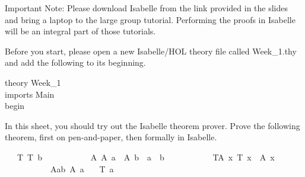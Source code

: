 %
\begin{isabellebody}%
%
%
\isadelimtheory
%
\endisadelimtheory
%
\isatagtheory
%
\endisatagtheory
{\isafoldtheory}%
%
\isadelimtheory
%
\endisadelimtheory
%
\begin{isamarkuptext}%
%
\end{isamarkuptext}\isamarkuptrue%
%
\begin{isamarkuptext}%
Important Note: Please download Isabelle from the link provided in the slides and bring a 
      laptop to the large group tutorial. Performing the proofs in Isabelle will be an integral part
      of those tutorials.%
\end{isamarkuptext}\isamarkuptrue%
%
\begin{isamarkuptext}%
Before you start, please open a new Isabelle/HOL theory file called Week\_1.thy and add the
       following to its beginning.

\noindent theory Week\_1\\
imports Main\\
begin%
\end{isamarkuptext}\isamarkuptrue%
%
\begin{isamarkuptext}%
%
\end{isamarkuptext}\isamarkuptrue%
%
\begin{isamarkuptext}%
In this sheet, you should try out the Isabelle theorem prover.
Prove the following theorem, first on pen-and-paper, then formally in Isabelle.%
\end{isamarkuptext}\isamarkuptrue%
\isamarkupfalse%
\isanewline
\ \ \ T{\isacharcolon}{\kern0pt}\ {\isachardoublequoteopen}T\ b{\isachardoublequoteclose}\isanewline
\ \ \ \ \ \ \ \ \ \ \ A{\isacharcolon}{\kern0pt}\ {\isachardoublequoteopen}A\ a\ {\isasymand}\ A\ b\ {\isasymLongrightarrow}\ a\ {\isacharequal}{\kern0pt}\ b{\isachardoublequoteclose}\isanewline
\ \ \ \ \ \ \ \ \ \ \ TA{\isacharcolon}{\kern0pt}\ {\isachardoublequoteopen}{\isasymAnd}x{\isachardot}{\kern0pt}\ T\ x\ {\isasymLongrightarrow}\ A\ x{\isachardoublequoteclose}\isanewline
\ \ \ \ \ \ \ \ \ \ \ Aab{\isacharcolon}{\kern0pt}\ {\isachardoublequoteopen}A\ a{\isachardoublequoteclose}\isanewline
\ \ \ {\isachardoublequoteopen}T\ a{\isachardoublequoteclose}%
\isadelimproof
%
\endisadelimproof
%
\isatagproof
%
\endisatagproof
{\isafoldproof}%
%
\isadelimproof
%
\endisadelimproof
%
\isadelimtheory
%
\endisadelimtheory
%
\isatagtheory
%
\endisatagtheory
{\isafoldtheory}%
%
\isadelimtheory
%
\endisadelimtheory
%
\end{isabellebody}%
\endinput

